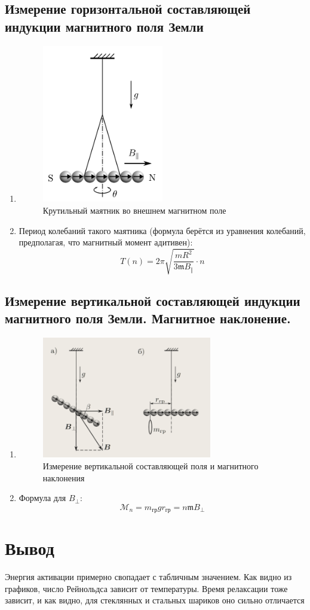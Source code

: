 \documentclass[11pt,a4paper]{article}
\newcommand{\mk}{\mathfrak}
\begin{document}
\subsection{Измерение горизонтальной составляющей индукции магнитного
поля Земли}\begin{enumerate}
  \item \begin{figure}[H]
    \includegraphics*[width=0.5\textwidth]{2023-10-02-17-27-25.png}
    \caption{Крутильный маятник во внешнем магнитном поле}
  \end{figure}
  \item Период колебаний такого маятника (формула берётся из уравнения колебаний, предполагая, что магнитный момент адитивен):
  $$T(n) = 2\pi \sqrt{\frac{mR^2}{3\mk m B_\Vert }} \cdot n$$
\end{enumerate}



\subsection{Измерение вертикальной составляющей индукции магнитного поля
Земли. Магнитное наклонение.}
\begin{enumerate}
  \item \begin{figure}[H]
    \includegraphics*[width=0.7\textwidth]{2023-10-02-17-36-48.png}
    \caption{Измерение вертикальной составляющей поля и магнитного наклонения}
  \end{figure}
  \item Формула для $B_\bot:$
  $$\mathcal{M}_n = m_\text{гр}gr_\text{гр} = n \mk m B_\bot$$
\end{enumerate}

\section*{Вывод}
Энергия активации примерно свопадает с табличным значением.
Как видно из графиков, число Рейнольдса зависит от температуры.
Время релаксации тоже зависит, и как видно, для стеклянных и стальных шариков оно сильно отличается
\end{document}
